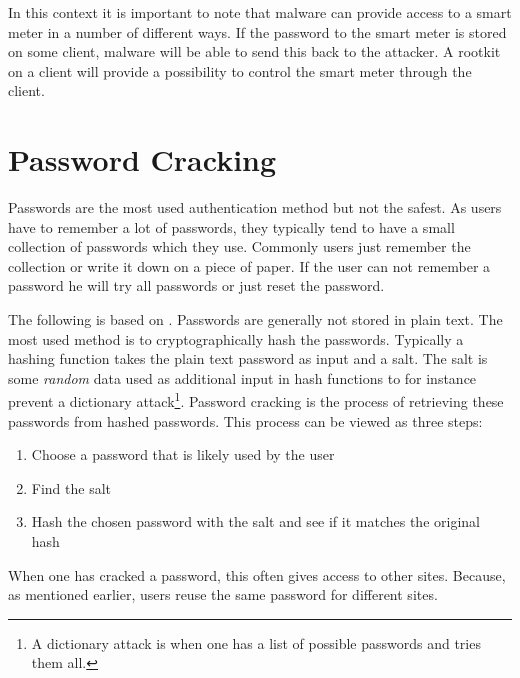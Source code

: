 In this context it is important to note that malware can provide access to a smart meter in a number of different ways.
If the password to the smart meter is stored on some client, malware will be able to send this back to the attacker.
A rootkit on a client will provide a possibility to control the smart meter through the client.

\section{Password Cracking}\label{password_cracking}
Passwords are the most used authentication method but not the safest.
As users have to remember a lot of passwords, they typically tend to have a small collection of passwords which they use.
Commonly users just remember the collection or write it down on a piece of paper.
If the user can not remember a password he will try all passwords or just reset the password.\cite{florencio2007large,bishop1995improving,dell2010password}

The following is based on \citet{marechal2008advances}.
Passwords are generally not stored in plain text.
The most used method is to cryptographically hash the passwords.
Typically a hashing function takes the plain text password as input and a salt.
The salt is some \textit{random} data used as additional input in hash functions to for instance prevent a dictionary attack\footnote{A dictionary attack is when one has a list of possible passwords and tries them all.}.
Password cracking is the process of retrieving these passwords from hashed passwords.
This process can be viewed as three steps:
\begin{enumerate}
\item Choose a password that is likely used by the user
\item Find the salt
\item Hash the chosen password with the salt and see if it matches the original hash
\end{enumerate}

When one has cracked a password, this often gives access to other sites.
Because, as mentioned earlier, users reuse the same password for different sites.

